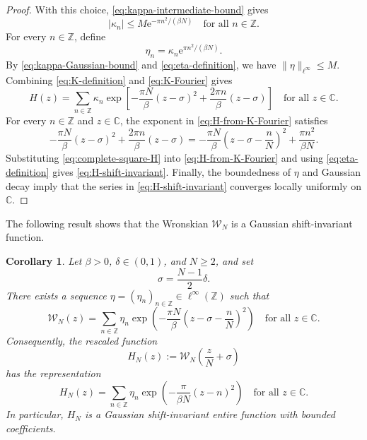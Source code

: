 \documentclass[11pt]{amsart}
\numberwithin{equation}{section}
\newtheorem{corollary}[theorem]{Corollary}
\theoremstyle{definition}
\theoremstyle{remark}
\newcommand{\C}{\mathbb C}
\newcommand{\Z}{\mathbb Z}
\newcommand{\e}{\mathrm e}
\newcommand{\cW}{\mathcal W}
\begin{document}
\begin{proof}
    With this choice, \eqref{eq:kappa-intermediate-bound} gives 
    \begin{equation}\label{eq:kappa-Gaussian-bound}
        |\kappa_n| \leq M\e^{-\pi n^2/(\beta N)} \quad\text{for all }n\in\Z.
    \end{equation} 
    For every $n\in\Z$, define
    \begin{equation}\label{eq:eta-definition} 
        \eta_n=\kappa_n\e^{\pi n^2/(\beta N)}.
    \end{equation} 
    By \eqref{eq:kappa-Gaussian-bound} and \eqref{eq:eta-definition}, we have $\|\eta\|_{\ell^\infty}\leq M$. Combining \eqref{eq:K-definition} and \eqref{eq:K-Fourier} gives 
    \begin{equation}\label{eq:H-from-K-Fourier}
        H(z)=\sum_{n\in\Z}\kappa_n \exp\left[ -\frac{\pi N}{\beta}(z-\sigma)^2 +\frac{2\pi n}{\beta}(z-\sigma) \right] \quad\text{for all }z\in\C.
    \end{equation} 
    For every $n\in\Z$ and $z\in\C$, the exponent in \eqref{eq:H-from-K-Fourier} satisfies
    \begin{equation}\label{eq:complete-square-H}
        -\frac{\pi N}{\beta}(z-\sigma)^2 +\frac{2\pi n}{\beta}(z-\sigma) = -\frac{\pi N}{\beta} \left(z-\sigma-\frac nN\right)^2 +\frac{\pi n^2}{\beta N}. 
    \end{equation} 
    Substituting \eqref{eq:complete-square-H} into \eqref{eq:H-from-K-Fourier} and using \eqref{eq:eta-definition} gives \eqref{eq:H-shift-invariant}. Finally, the boundedness of $\eta$ and Gaussian decay imply that the series in \eqref{eq:H-shift-invariant} converges locally uniformly on $\C$. \end{proof}

The following result shows that the Wronskian $\cW_N$ is a Gaussian shift-invariant function.
\begin{corollary}\label{cor:W-shift-invariant}
    Let $\beta>0$, $\delta\in(0,1)$, and $N\geq2$, and set
    \begin{equation}
        \sigma=\frac{N-1}{2}\delta.
    \end{equation}
    There exists a sequence $\eta=(\eta_n)_{n\in\Z}\in\ell^\infty(\Z)$ such that
    \begin{equation}
        \cW_N(z) = \sum_{n\in\Z}\eta_n \exp\left( -\frac{\pi N}{\beta} \left(z-\sigma-\frac nN\right)^2 \right)
        \quad \text{for all } z \in \C.
    \end{equation}
    Consequently, the rescaled function
    \begin{equation}\label{eq:rescaled-W}
        H_N(z):= \cW_N\left(\frac zN+\sigma\right)
    \end{equation}
    has the representation
    \begin{equation}
        H_N(z) = \sum_{n\in\Z}\eta_n \exp\left( -\frac{\pi}{\beta N}(z-n)^2 \right)
        \quad \text{for all } z \in \C.
    \end{equation}
    In particular, $H_N$ is a Gaussian shift-invariant entire function with bounded coefficients. \end{corollary}
\end{document}
